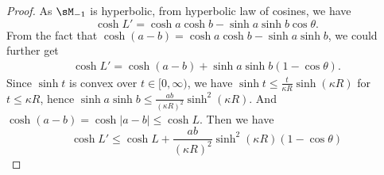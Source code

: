 \begin{proof}
As $\sM_{-1}$ is hyperbolic, from hyperbolic law of cosines, we have
\begin{equation}
    \cosh L' = \cosh a \cosh b - \sinh a \sinh b \cos \theta.
\end{equation}
From the fact that $\cosh(a - b) = \cosh a \cosh b - \sinh a \sinh b$, we could further get
\begin{equation}
    \begin{aligned}
        \cosh L' = \cosh(a-b) + \sinh a \sinh b (1 - \cos \theta).
    \end{aligned}
\end{equation}
Since $\sinh t $ is convex over $t \in [0,\infty)$, we have $\sinh t \leq \frac{t}{\kappa R} \sinh (\kappa R)$ for $t \le \kappa R$, hence $\sinh a \sinh b \leq \frac{ab}{(\kappa R)^2} \sinh^2(\kappa R)$. And $\cosh (a-b) = \cosh|a-b| \leq \cosh L$. 
Then we have 
\begin{equation}
    \cosh L' \leq \cosh L + \frac{ab}{(\kappa R)^2} \sinh^2(\kappa R)(1 - \cos \theta)
\end{equation}


\end{proof}

